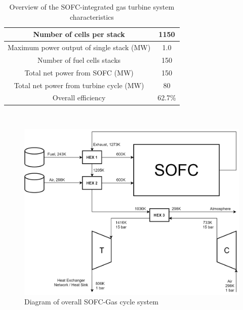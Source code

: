 
\begin{table}[h!]
\centering
\caption{Overview of the SOFC-integrated gas turbine system characteristics}
\label{LMtable:overview}
\begin{tabular}{|c|c|}
\hline
Number of cells per stack                 & 1150   \\ \hline
Maximum power output of single stack (MW) & 1.0    \\ \hline
Number of fuel cells stacks               & 150    \\ \hline
Total net power from SOFC (MW)            & 150    \\ \hline
Total net power from turbine cycle (MW)   & 80     \\ \hline
Overall efficiency                        & 62.7\% \\ \hline
\end{tabular}
\end{table}

\hspace{1cm}\\

\begin{figure}[htb]
    \centering
    \includegraphics[scale=0.24]{FinalSystemDiagram.png}
    \caption{Diagram of overall SOFC-Gas cycle system}
    \label{LMfig:finalsystemdiagram}
\end{figure}


